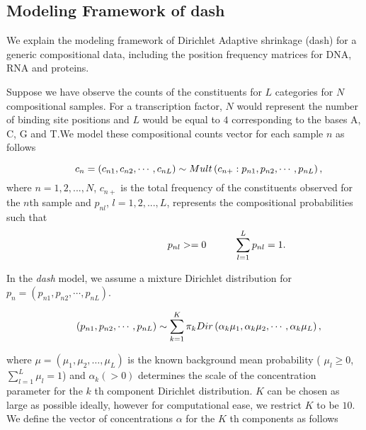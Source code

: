 \documentclass{bmcart}
\begin{document}
\subsection*{Modeling Framework of dash}

We explain the modeling framework of Dirichlet Adaptive shrinkage (dash) for a generic compositional data, including the position frequency matrices for DNA, RNA and proteins.

Suppose we have observe the counts of the constituents for $L$ categories for $N$ compositional samples. For a transcription factor, $N$ would represent  the number of binding site positions and $L$ would be equal to $4$ corresponding to the bases A, C, G and T.We model these compositional counts vector for each sample $n$ as follows 

\begin{equation}
 \hspace{1 cm} c_n=(c_{n1}, c_{n2}, \cdots, c_{nL}) \sim Mult \left ( c_{n+} : p_{n1}, p_{n2}, \cdots, p_{nL} \right ),  
\end{equation}
where $n=1,2,...,N$, $c_{n+}$ is the total frequency of the constituents observed for the $n$th sample and $p_{nl}$, $l=1,2,...,L$, represents the compositional probabilities such that 
\begin{equation}
 \hspace{3 cm} p_{nl}  >= 0 \hspace {1 cm} \sum_{l=1}^{L} p_{nl} = 1 .
\end{equation}

In the \textit{dash} model, we assume a mixture Dirichlet distribution for $p_{n}= \left ( p_{n1}, p_{n2}, \cdots, p_{nL} \right) $. 

\begin{equation}\label{dir_prior}
\hspace{1 cm} \left ( p_{n1}, p_{n2}, \cdots, p_{nL} \right ) \sim \sum_{k=1}^{K} \pi_{k} Dir \left (\alpha_{k} \mu_{1}, \alpha_{k} \mu_{2}, \cdots, \alpha_{k} \mu_{L} \right )  ,
\end{equation}

where $\mu = \left ( \mu_1, \mu_2, \ldots, \mu_L \right) $ is the known background mean probability ( $\mu_{l} \geq 0$, $\sum_{l=1}^{L} \mu_{l} = 1 $) and $\alpha_k (> 0)$ determines the scale of the concentration parameter for the $k$ th component Dirichlet distribution. $K$ can be chosen as large as possible ideally, however for computational ease, we restrict $K$ to be $10$. We define the vector of concentrations $\alpha$ for the $K$ th components as follows 
\end{document}
